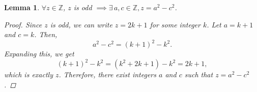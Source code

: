 \documentclass[]{article}
\newtheorem{lemmax}{Lemma}[section]
\begin{document}
\begin{lemmax}
$\forall z \in \mathbb{Z}$, $z$ is odd $ \implies \exists \, a, c \in \mathbb{Z}, z = a^2 - c^2$.
\begin{proof}
Since $z$ is odd, we can write $z = 2k + 1$ for some integer $k$. Let $a = k + 1$ and $c = k$. Then,
\[
a^2 - c^2 = (k + 1)^2 - k^2.
\]
Expanding this, we get
\[
(k + 1)^2 - k^2 = (k^2 + 2k + 1) - k^2 = 2k + 1,
\]
which is exactly $z$. Therefore, there exist integers $a$ and $c$ such that $z = a^2 - c^2$.
\end{proof}
\end{lemmax}
\end{document}
